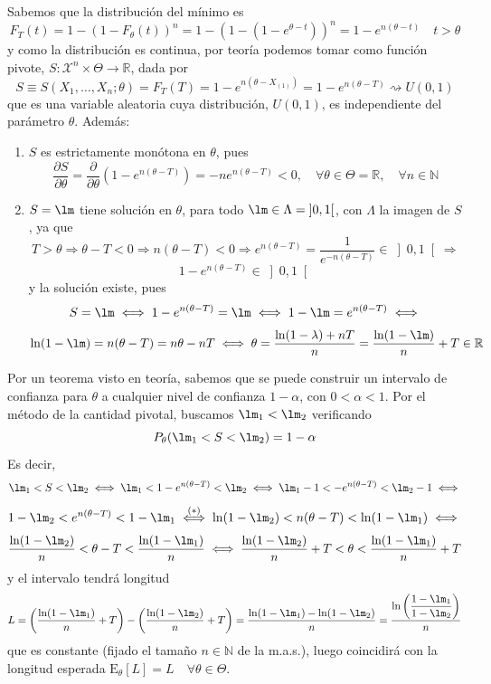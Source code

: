 \documentclass[12pt]{article}
\newcommand{\E}{\mathrm{E}}
\newcommand{\R}{\mathbb{R}}
\newcommand{\X}{\mathcal{X}}
\newcommand{\N}{\mathbb{N}}
\begin{document}
\begin{ejercicio}[2,25 puntos]
\begin{enumerate}
            Sabemos que la distribución del mínimo es
            $$F_T(t) = 1 - (1 - F_\theta(t))^n = 1 - (1 - (1-e^{\theta-t}))^n = 1 - e^{n(\theta - t)} \quad t > \theta$$
            y como la distribución es continua, por teoría podemos tomar como función pivote, 
            $S : \X^n \times \Theta \to \R$, dada por 
            $$S \equiv S(X_1, \ldots, X_n; \theta) = F_T(T) = 1 - e^{n(\theta - X_{(1)})} = 1 - e^{n(\theta - T)} \rightsquigarrow U(0,1)$$ que es
            una variable aleatoria cuya distribución, $U(0,1)$, es independiente del parámetro $\theta$.
            Además:
            \begin{enumerate}
                \item $S$ es estrictamente monótona en $\theta$, pues
                $$\dfrac{\partial S}{\partial \theta} = \dfrac{\partial}{\partial \theta} (1 - e^{n(\theta - T)}) = - ne^{n(\theta - T)} < 0, \quad \forall \theta \in \Theta = \R, \quad \forall n \in \N$$
                \item $S = \lm$ tiene solución en $\theta$, para todo $\lm \in \Lambda = \left]0, 1 \right[$, con $\Lambda$ la imagen de $S$, ya que
                $$T > \theta \Longrightarrow \theta - T < 0 \Longrightarrow n(\theta - T) < 0 \Longrightarrow e^{n(\theta - T)} = \dfrac{1}{e^{-n(\theta-T)}} \in \left]0, 1 \right[ \Longrightarrow$$
                $$1 - e^{n(\theta - T)} \in \left]0,1\right[$$
                y la solución existe, pues
                $$S = \lm \iff 1 - e^{n(\theta - T)} = \lm \iff 1 - \lm = e^{n(\theta - T)} \iff$$
                $$\ln(1-\lm) = n(\theta -T) = n\theta - nT \iff \theta = \dfrac{\ln(1-\lambda)  + nT}{n} = \dfrac{\ln(1-\lm)}{n} + T \in \R$$ 
            \end{enumerate}
            Por un teorema visto en teoría, sabemos que se puede construir un intervalo de confianza para $\theta$ a cualquier nivel
            de confianza $1-\alpha$, con $0 < \alpha < 1$. Por el método de la cantidad pivotal, buscamos $\lm_1 < \lm_2$ 
            verificando $$P_\theta(\lm_1 < S < \lm_2) = 1 - \alpha$$
            Es decir,
            $$\lm_1 < S < \lm_2 \iff \lm_1 < 1 - e^{n(\theta - T)} < \lm_2 \iff \lm_1 - 1 < - e^{n(\theta - T)} < \lm_2 - 1 \iff $$
            $$1 - \lm_2 < e^{n(\theta - T)} < 1 - \lm_1 \stackrel{(*)}{\iff} \ln(1-\lm_2) < n(\theta-T) < \ln(1-\lm_1) \iff $$
            $$\dfrac{\ln(1-\lm_2)}{n} < \theta-T < \dfrac{\ln(1-\lm_1)}{n} \iff \dfrac{\ln(1-\lm_2)}{n} + T < \theta < \dfrac{\ln(1-\lm_1)}{n} + T$$
            y el intervalo tendrá longitud $$L = \left(\dfrac{\ln(1-\lm_1)}{n} + T \right) - \left(\dfrac{\ln(1-\lm_2)}{n} + T \right) = \dfrac{\ln(1-\lm_1) - \ln(1-\lm_2)}{n} = 
            \dfrac{\ln \left( \dfrac{1-\lm_1}{1-\lm_2} \right)}{n}$$ que es constante (fijado el tamaño $n \in \N$ de la m.a.s.), luego coincidirá 
            con la longitud esperada $\E_\theta[L] = L \quad \forall \theta \in \Theta$. \\
            

\end{enumerate}
\end{ejercicio}
\end{document}
